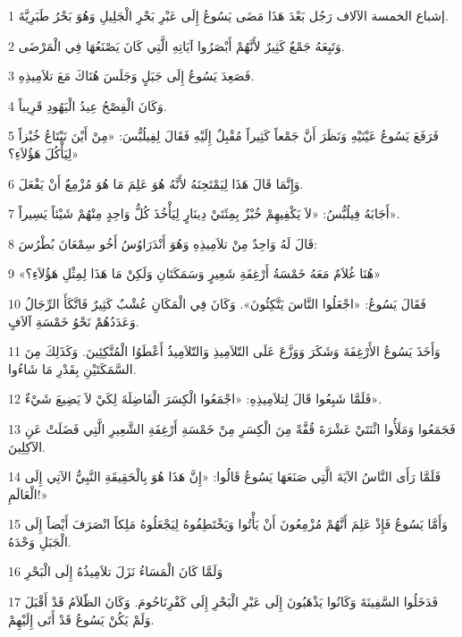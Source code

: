 \par 1 إشباع الخمسة الآلاف رَجُل بَعْدَ هَذَا مَضَى يَسُوعُ إِلَى عَبْرِ بَحْرِ الْجَلِيلِ وَهُوَ بَحْرُ طَبَرِيَّةَ.
\par 2 وَتَبِعَهُ جَمْعٌ كَثِيرٌ لأَنَّهُمْ أَبْصَرُوا آيَاتِهِ الَّتِي كَانَ يَصْنَعُهَا فِي الْمَرْضَى.
\par 3 فَصَعِدَ يَسُوعُ إِلَى جَبَلٍ وَجَلَسَ هُنَاكَ مَعَ تلاَمِيذِهِ.
\par 4 وَكَانَ الْفِصْحُ عِيدُ الْيَهُودِ قَرِيباً.
\par 5 فَرَفَعَ يَسُوعُ عَيْنَيْهِ وَنَظَرَ أَنَّ جَمْعاً كَثِيراً مُقْبِلٌ إِلَيْهِ فَقَالَ لِفِيلُبُّسَ: «مِنْ أَيْنَ نَبْتَاعُ خُبْزاً لِيَأْكُلَ هَؤُلاَءِ؟»
\par 6 وَإِنَّمَا قَالَ هَذَا لِيَمْتَحِنَهُ لأَنَّهُ هُوَ عَلِمَ مَا هُوَ مُزْمِعٌ أَنْ يَفْعَلَ.
\par 7 أَجَابَهُ فِيلُبُّسُ: «لاَ يَكْفِيهِمْ خُبْزٌ بِمِئَتَيْ دِينَارٍ لِيَأْخُذَ كُلُّ وَاحِدٍ مِنْهُمْ شَيْئاً يَسِيراً».
\par 8 قَالَ لَهُ وَاحِدٌ مِنْ تلاَمِيذِهِ وَهُوَ أَنْدَرَاوُسُ أَخُو سِمْعَانَ بُطْرُسَ:
\par 9 «هُنَا غُلاَمٌ مَعَهُ خَمْسَةُ أَرْغِفَةِ شَعِيرٍ وَسَمَكَتَانِ وَلَكِنْ مَا هَذَا لِمِثْلِ هَؤُلاَءِ؟»
\par 10 فَقَالَ يَسُوعُ: «اجْعَلُوا النَّاسَ يَتَّكِئُونَ». وَكَانَ فِي الْمَكَانِ عُشْبٌ كَثِيرٌ فَاتَّكَأَ الرِّجَالُ وَعَدَدُهُمْ نَحْوُ خَمْسَةِ آلاَفٍ.
\par 11 وَأَخَذَ يَسُوعُ الأَرْغِفَةَ وَشَكَرَ وَوَزَّعَ عَلَى التّلاَمِيذِ وَالتّلاَمِيذُ أَعْطَوُا الْمُتَّكِئِينَ. وَكَذَلِكَ مِنَ السَّمَكَتَيْنِ بِقَدْرِ مَا شَاءُوا.
\par 12 فَلَمَّا شَبِعُوا قَالَ لِتلاَمِيذِهِ: «اجْمَعُوا الْكِسَرَ الْفَاضِلَةَ لِكَيْ لاَ يَضِيعَ شَيْءٌ».
\par 13 فَجَمَعُوا وَمَلَأُوا اثْنَتَيْ عَشْرَةَ قُفَّةً مِنَ الْكِسَرِ مِنْ خَمْسَةِ أَرْغِفَةِ الشَّعِيرِ الَّتِي فَضَلَتْ عَنِ الآكِلِينَ.
\par 14 فَلَمَّا رَأَى النَّاسُ الآيَةَ الَّتِي صَنَعَهَا يَسُوعُ قَالُوا: «إِنَّ هَذَا هُوَ بِالْحَقِيقَةِ النَّبِيُّ الآتِي إِلَى الْعَالَمِ!»
\par 15 وَأَمَّا يَسُوعُ فَإِذْ عَلِمَ أَنَّهُمْ مُزْمِعُونَ أَنْ يَأْتُوا وَيَخْتَطِفُوهُ لِيَجْعَلُوهُ مَلِكاً انْصَرَفَ أَيْضاً إِلَى الْجَبَلِ وَحْدَهُ.
\par 16 وَلَمَّا كَانَ الْمَسَاءُ نَزَلَ تلاَمِيذُهُ إِلَى الْبَحْرِ
\par 17 فَدَخَلُوا السَّفِينَةَ وَكَانُوا يَذْهَبُونَ إِلَى عَبْرِ الْبَحْرِ إِلَى كَفْرِنَاحُومَ. وَكَانَ الظّلاَمُ قَدْ أَقْبَلَ وَلَمْ يَكُنْ يَسُوعُ قَدْ أَتَى إِلَيْهِمْ.
